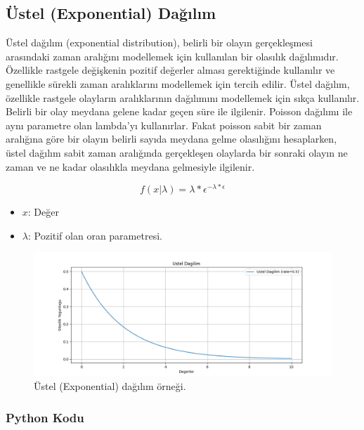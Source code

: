 \newpage

\subsection{Üstel (Exponential) Dağılım}
Üstel dağılım (exponential distribution), belirli bir olayın gerçekleşmesi arasındaki zaman aralığını modellemek için kullanılan bir olasılık dağılımıdır. Özellikle rastgele değişkenin pozitif değerler alması gerektiğinde kullanılır ve genellikle sürekli zaman aralıklarını modellemek için tercih edilir. Üstel dağılım, özellikle rastgele olayların aralıklarının dağılımını modellemek için sıkça kullanılır. Belirli bir olay meydana gelene kadar geçen süre ile ilgilenir. Poisson dağılımı ile aynı parametre olan lambda'yı kullanırlar. Fakat poisson sabit bir zaman aralığına göre bir olayın belirli sayıda meydana gelme olasılığını hesaplarken, üstel dağılım sabit zaman aralığında gerçekleşen olaylarda bir sonraki olayın ne zaman ve ne kadar olasılıkla meydana gelmesiyle ilgilenir.

\[f(x | \lambda) = \lambda * \epsilon ^{-\lambda * \epsilon}\]
\begin{itemize}
	\item $x$: Değer
	\item $\lambda$: Pozitif olan oran parametresi.
\end{itemize}

\begin{figure}[h]
    \centering
    \includegraphics[width=1\textwidth]{images/exponential_distribution.png}
    \caption{Üstel (Exponential) dağılım örneği.}
    \label{fig:enter-label}
\end{figure}

\subsubsection{Python Kodu}


